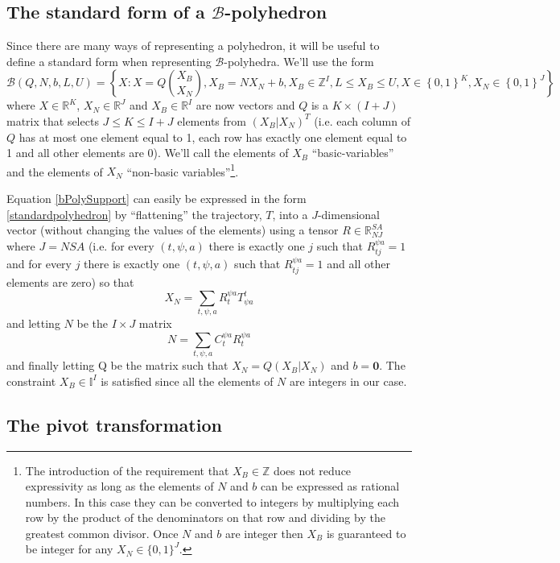 \documentclass{article}
\begin{document}
\subsection{The standard form of a $\mathcal{B}$-polyhedron}

Since there are many ways of representing a polyhedron, it will be useful to define a standard form when representing $\mathcal{B}$-polyhedra. We'll use the form
\begin{equation}
\mathcal{B}(Q,N,b,L,U) = \left\{X: X = Q{X_B\choose X_N}, X_B = NX_N + b, X_B\in\mathbb{Z}^I, L \le X_B \le U, X \in \left\{ 0,1\right\}^K, X_N \in \left\{0,1\right\}^J \right\}
\label{standardpolyhedron}
\end{equation}
where $X\in \mathbb{R}^K$, $X_N\in\mathbb{R}^J$ and $X_B\in\mathbb{R}^I$ are now vectors and $Q$ is a $K\times (I+J)$ matrix that selects $J \le K \le I+J$ elements from $(X_B|X_N)^T$ (i.e. each column of $Q$ has at most one element equal to 1, each row has exactly one element equal to 1 and all other elements are 0). We'll call the elements of $X_B$ ``basic-variables'' and the elements of $X_N$ ``non-basic variables''\footnote{The introduction of the requirement that $X_B \in \mathbb{Z}$ does not reduce expressivity as long as the elements of $N$ and $b$ can be expressed as rational numbers. In this case they can be converted to integers by multiplying each row by the product of the denominators on that row and dividing by the greatest common divisor. Once $N$ and $b$ are integer then $X_B$ is guaranteed to be integer for any $X_N\in\{0,1\}^J$.}.

Equation \ref{bPolySupport} can easily be expressed in the form \ref{standardpolyhedron} by ``flattening'' the trajectory, $T$, into a $J$-dimensional vector (without changing the values of the elements) using a tensor $R\in\mathbb{R}^{SA}_{NJ}$ where $J=NSA$ (i.e. for every $(t, \psi, a)$ there is exactly one $j$ such that $R^{\psi a}_{t j} = 1$ and for every $j$ there is exactly one $(t,\psi,a)$ such that $R^{\psi a}_{t j} = 1$ and all other elements are zero) so that
\[
X_N = \sum_{t,\psi,a}R^{\psi a}_t T^t_{\psi a}
\]
and letting $N$ be the $I\times J$ matrix
\[
N = \sum_{t,\psi,a} C^{\psi a}_t R^{\psi a}_t
\]
and finally letting Q be the matrix such that $X_N = Q(X_B|X_N)$ and $b = \mathbf{0}$. The constraint $X_B\in\mathbb{I}^I$ is satisfied since all the elements of $N$ are integers in our case.

\subsection{The pivot transformation}
\end{document}

